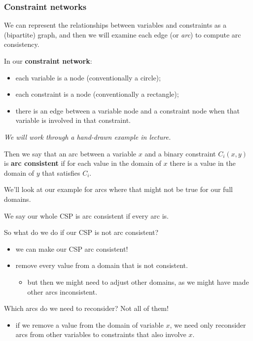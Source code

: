 \documentclass[11pt]{article}
\begin{document}
\subsubsection{Constraint networks}

We can represent the relationships between variables and constraints as a (bipartite) graph, and then we will examine each edge (or \emph{arc}) to compute arc consistency.

In our \textbf{constraint network}:
\begin{itemize}
    \item each variable is a node (conventionally a circle);
    \item each constraint is a node (conventionally a rectangle);
    \item there is an edge between a variable node and a constraint node when that variable is involved in that constraint.
\end{itemize}

\emph{We will work through a hand-drawn example in lecture.}

Then we say that an arc between a variable $x$ and a binary constraint $C_i(x, y)$ is \textbf{arc consistent} if for each value in the domain of $x$ there is a value in the domain of $y$ that satisfies $C_i$.

We'll look at our example for arcs where that might not be true for our full domains.

We say our whole CSP is arc consistent if every arc is.

So what do we do if our CSP is not arc consistent?
\begin{itemize}
    \item we can make our CSP arc consistent!
    \item remove every value from a domain that is not consistent.
    \begin{itemize}
        \item but then we might need to adjust other domains, as we might have made other arcs inconsistent.
    \end{itemize}
\end{itemize}

Which arcs do we need to reconsider? Not all of them!
\begin{itemize}
    \item if we remove a value from the domain of variable $x$, we need only reconsider arcs from other variables to constraints that also involve $x$.
\end{itemize}
\end{document}
